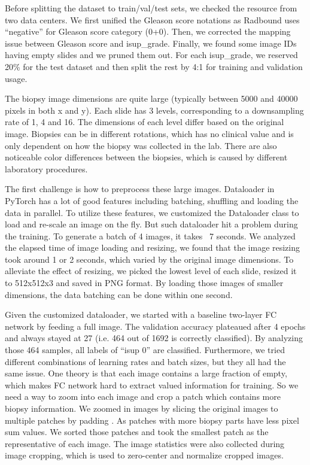 \documentclass[10pt,twocolumn,letterpaper]{article}
\begin{document}
Before splitting the dataset to train/val/test sets, we checked the resource from two data centers. We first unified the Gleason score notations as Radbound uses “negative” for Gleason score category (0+0). Then, we corrected the mapping issue between Gleason score and isup\_grade. Finally, we found some image IDs having empty slides and we pruned them out. For each isup\_grade, we reserved 20\% for the test dataset and then split the rest by 4:1 for training and validation usage.

The biopsy image dimensions are quite large (typically between 5000 and 40000 pixels in both x and y).  Each slide has 3 levels, corresponding to a downsampling rate of 1, 4 and 16. The dimensions of each level differ based on the original image. Biopsies can be in different rotations, which has no clinical value and is only dependent on how the biopsy was collected in the lab. There are also noticeable color differences between the biopsies, which is caused by different laboratory procedures.

The first challenge is how to preprocess these large images. Dataloader in PyTorch has a lot of good features including batching, shuffling and loading the data in parallel. To utilize these features, we customized the Dataloader class to load and re-scale an image on the fly. But such dataloader hit a problem during the training. To generate a batch of 4 images, it takes ~7 seconds. We analyzed the elapsed time of image loading and resizing, we found that the image resizing took around 1 or 2 seconds, which varied by the original image dimensions. To alleviate the effect of resizing, we picked the lowest level of each slide, resized it to 512x512x3 and saved in PNG format. By loading those images of smaller dimensions, the data batching can be done within one second.

Given the customized dataloader, we started with a baseline two-layer FC network by feeding a full image. The validation accuracy plateaued after 4 epochs and always stayed at 27 (i.e. 464 out of 1692 is correctly classified). By analyzing those 464 samples, all labels of “isup 0” are classified. Furthermore, we tried different combinations of learning rates and batch sizes, but they all had the same issue. One theory is that each image contains a large fraction of empty, which makes FC network hard to extract valued information for training. So we need a way to zoom into each image and crop a patch which contains more biopsy information. We zoomed in images by slicing the original images to multiple patches by padding \cite{Authors02}. As patches with more biopsy parts have less pixel sum values. We sorted those patches and took the smallest patch as the representative of each image. The image statistics were also collected during image cropping, which is used to zero-center and normalize cropped images.
\end{document}
